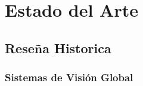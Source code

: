 
\chapter{Estado del Arte}
\section{Rese\~na Historica}
\subsection{\textbf{Sistemas de Visi\'on Global}}

